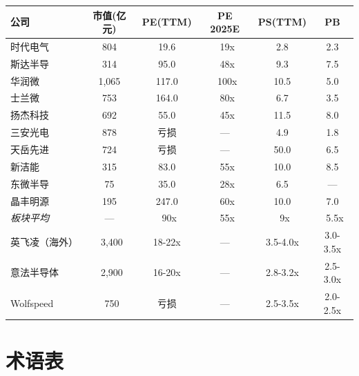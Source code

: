 \begin{exhibitbox}[表 A-5：重点公司估值对照表]
\centering
\small
\setlength{\tabcolsep}{4pt}
\begin{tabularx}{\textwidth}{X c c c c c}
\toprule
\textbf{公司} & \textbf{市值(亿元)} & \textbf{PE(TTM)} & \textbf{PE 2025E} & \textbf{PS(TTM)} & \textbf{PB} \\
\midrule
时代电气 & 804 & 19.6 & ~19x & 2.8 & 2.3 \\
斯达半导 & 314 & 95.0 & ~48x & 9.3 & 7.5 \\
华润微 & 1,065 & 117.0 & ~100x & 10.5 & 5.0 \\
士兰微 & 753 & 164.0 & ~80x & 6.7 & 3.5 \\
扬杰科技 & 692 & 55.0 & ~45x & 11.5 & 8.0 \\
三安光电 & 878 & 亏损 & — & 4.9 & 1.8 \\
天岳先进 & 724 & 亏损 & — & 50.0 & 6.5 \\
新洁能 & 315 & 83.0 & ~55x & 10.0 & 8.5 \\
东微半导 & 75 & 35.0 & ~28x & 6.5 & — \\
晶丰明源 & 195 & 247.0 & ~60x & 10.0 & 7.0 \\
\midrule
\rowcolor{lightgrey}
\textit{板块平均} & — & ~90x & ~55x & ~9x & ~5.5x \\
\midrule
英飞凌（海外） & ~3,400 & 18-22x & — & 3.5-4.0x & 3.0-3.5x \\
意法半导体 & ~2,900 & 16-20x & — & 2.8-3.2x & 2.5-3.0x \\
Wolfspeed & ~750 & 亏损 & — & 2.5-3.5x & 2.0-2.5x \\
\bottomrule
\end{tabularx}
\end{exhibitbox}

\section{术语表}

\vspace{0.3em}

